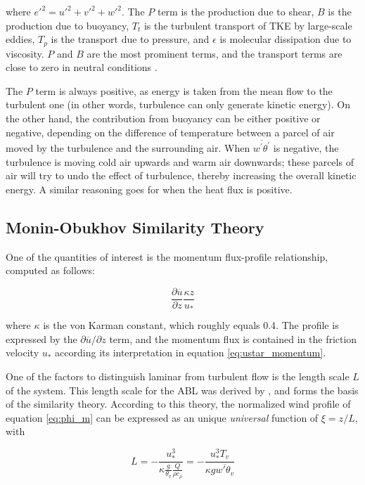 \documentclass[a4paper]{book}
\begin{document}
\noindent where ${e'}^2={u'}^2+{v'}^2+{w'}^2$. The $P$ term is the production due to shear, $B$ is the production due to buoyancy, $T_t$ is the turbulent transport of TKE by large-scale eddies, $T_p$ is the transport due to pressure, and $\epsilon$ is molecular dissipation due to viscosity. $P$ and $B$ are the most prominent terms, and the transport terms are close to zero in neutral conditions \citep{basicatm}.

The $P$ term is always positive, as energy is taken from the mean flow to the turbulent one (in other words, turbulence can only generate kinetic energy). On the other hand, the contribution from buoyancy can be either positive or negative, depending on the difference of temperature between a parcel of air moved by the turbulence and the surrounding air. When $\overline{w^\prime\theta^\prime}$ is negative, the turbulence is moving cold air upwards and warm air downwards; these parcels of air will try to undo the effect of turbulence, thereby increasing the overall kinetic energy. A similar reasoning goes for when the heat flux is positive.

\subsection{Monin-Obukhov Similarity Theory}
\label{sec:most}
One of the quantities of interest is the momentum flux-profile relationship, computed as follows:

\begin{equation}
\label{eq:phi_m}
\frac{\partial\overline{u}}{\partial z}\frac{\kappa z}{u_*}
\end{equation}

where $\kappa$ is the von Karman constant, which roughly equals 0.4. The profile is expressed by the $\partial\overline{u}/\partial z$ term, and the momentum flux is contained in the friction velocity $u_*$ according its interpretation in equation \ref{eq:ustar_momentum}.

One of the factors to distinguish laminar from turbulent flow is the length scale $L$ of the system. This length scale for the ABL was derived by \cite{mostayyyy}, and forms the basis of the similarity theory. According to this theory, the normalized wind profile of equation \ref{eq:phi_m} can be expressed as an unique \emph{universal} function of $\xi=z/L$, with

\begin{equation}
\label{eq:most_l}
L=-\frac{u_*^3}{\kappa\frac{g}{\theta_v}\frac{Q}{\rho c_\rho}}
=-\frac{u_*^3 T_v}{\kappa g \overline{w'\theta_v}}
\end{equation}
\end{document}
